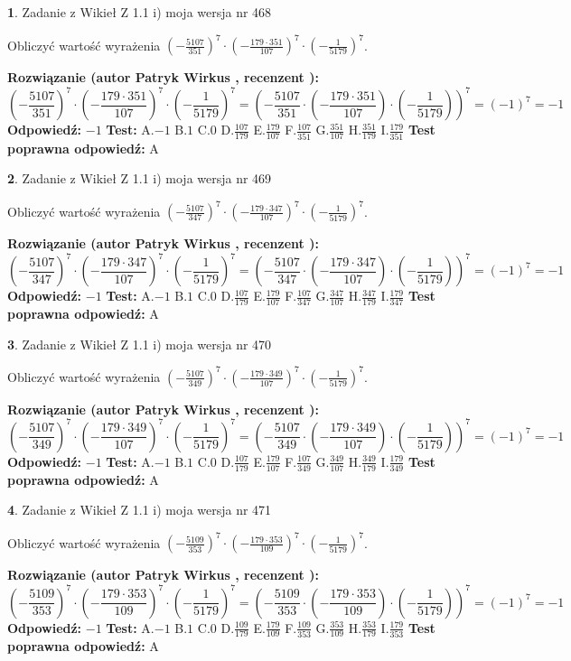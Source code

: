 \documentclass[12pt, a4paper]{article}
\theoremstyle{definition} %
\newtheorem{zad}{}
\newcommand{\zadStart}[1]{\begin{zad}#1\newline}
\newcommand{\zadStop}{\end{zad}}
\newcommand{\rozwStart}[2]{\noindent \textbf{Rozwiązanie (autor #1 , recenzent #2): }\newline}
\newcommand{\rozwStop}{\newline}
\newcommand{\odpStart}{\noindent \textbf{Odpowiedź:}\newline}
\newcommand{\odpStop}{\newline}
\newcommand{\testStart}{\noindent \textbf{Test:}\newline}
\newcommand{\testStop}{\newline}
\newcommand{\kluczStart}{\noindent \textbf{Test poprawna odpowiedź:}\newline}
\newcommand{\kluczStop}{\newline}
\begin{document}
\zadStart{Zadanie z Wikieł Z 1.1 i) moja wersja nr 468}

Obliczyć wartość wyrażenia $(-\frac{5107}{351})^{7} \cdot (-\frac{179 \cdot 351}{107})^{7} \cdot (-\frac{1}{5179})^{7}$.
\zadStop
\rozwStart{Patryk Wirkus}{}
$$(-\frac{5107}{351})^{7} \cdot (-\frac{179 \cdot 351}{107})^{7} \cdot (-\frac{1}{5179})^{7} = (-\frac{5107}{351} \cdot (-\frac{179 \cdot 351}{107}) \cdot (-\frac{1}{5179}))^{7} = (-1)^{7} = -1$$
\rozwStop
\odpStart
$-1$
\odpStop
\testStart
A.$-1$ B.$1$ C.$0$ D.$\frac{107}{179}$ E.$\frac{179}{107}$
F.$\frac{107}{351}$ G.$\frac{351}{107}$
H.$\frac{351}{179}$
I.$\frac{179}{351}$
\testStop
\kluczStart
A
\kluczStop



\zadStart{Zadanie z Wikieł Z 1.1 i) moja wersja nr 469}

Obliczyć wartość wyrażenia $(-\frac{5107}{347})^{7} \cdot (-\frac{179 \cdot 347}{107})^{7} \cdot (-\frac{1}{5179})^{7}$.
\zadStop
\rozwStart{Patryk Wirkus}{}
$$(-\frac{5107}{347})^{7} \cdot (-\frac{179 \cdot 347}{107})^{7} \cdot (-\frac{1}{5179})^{7} = (-\frac{5107}{347} \cdot (-\frac{179 \cdot 347}{107}) \cdot (-\frac{1}{5179}))^{7} = (-1)^{7} = -1$$
\rozwStop
\odpStart
$-1$
\odpStop
\testStart
A.$-1$ B.$1$ C.$0$ D.$\frac{107}{179}$ E.$\frac{179}{107}$
F.$\frac{107}{347}$ G.$\frac{347}{107}$
H.$\frac{347}{179}$
I.$\frac{179}{347}$
\testStop
\kluczStart
A
\kluczStop



\zadStart{Zadanie z Wikieł Z 1.1 i) moja wersja nr 470}

Obliczyć wartość wyrażenia $(-\frac{5107}{349})^{7} \cdot (-\frac{179 \cdot 349}{107})^{7} \cdot (-\frac{1}{5179})^{7}$.
\zadStop
\rozwStart{Patryk Wirkus}{}
$$(-\frac{5107}{349})^{7} \cdot (-\frac{179 \cdot 349}{107})^{7} \cdot (-\frac{1}{5179})^{7} = (-\frac{5107}{349} \cdot (-\frac{179 \cdot 349}{107}) \cdot (-\frac{1}{5179}))^{7} = (-1)^{7} = -1$$
\rozwStop
\odpStart
$-1$
\odpStop
\testStart
A.$-1$ B.$1$ C.$0$ D.$\frac{107}{179}$ E.$\frac{179}{107}$
F.$\frac{107}{349}$ G.$\frac{349}{107}$
H.$\frac{349}{179}$
I.$\frac{179}{349}$
\testStop
\kluczStart
A
\kluczStop



\zadStart{Zadanie z Wikieł Z 1.1 i) moja wersja nr 471}

Obliczyć wartość wyrażenia $(-\frac{5109}{353})^{7} \cdot (-\frac{179 \cdot 353}{109})^{7} \cdot (-\frac{1}{5179})^{7}$.
\zadStop
\rozwStart{Patryk Wirkus}{}
$$(-\frac{5109}{353})^{7} \cdot (-\frac{179 \cdot 353}{109})^{7} \cdot (-\frac{1}{5179})^{7} = (-\frac{5109}{353} \cdot (-\frac{179 \cdot 353}{109}) \cdot (-\frac{1}{5179}))^{7} = (-1)^{7} = -1$$
\rozwStop
\odpStart
$-1$
\odpStop
\testStart
A.$-1$ B.$1$ C.$0$ D.$\frac{109}{179}$ E.$\frac{179}{109}$
F.$\frac{109}{353}$ G.$\frac{353}{109}$
H.$\frac{353}{179}$
I.$\frac{179}{353}$
\testStop
\kluczStart
A
\kluczStop
\end{document}
